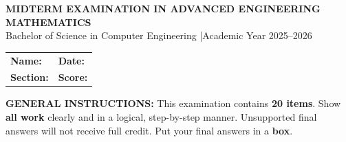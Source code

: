\documentclass[a4paper,10pt]{article}
\begin{document}

\begin{center}
    {\Large\bfseries\color{darkblue} MIDTERM EXAMINATION IN ADVANCED ENGINEERING MATHEMATICS}\\[4pt]
    {\small\color{black} Bachelor of Science in Computer Engineering \quad|\quad Academic Year 2025--2026}\\[6pt]
    \begin{tabular}{@{}p{} p{}@{}}
        \textbf{Name:}\enspace\underline{\hfill\hspace{6cm}}    &
        \textbf{Date:}\enspace\underline{\hfill\hspace{6cm}}      \\[6pt]
        \textbf{Section:}\enspace\underline{\hfill\hspace{6cm}} &
        \textbf{Score:}\enspace\underline{\hfill\hspace{6cm}}     \\
    \end{tabular}
\end{center}

\vspace{5pt}

\textbf{GENERAL INSTRUCTIONS:} This examination contains \textbf{20 items}. Show \textbf{all work} clearly and in a logical, step-by-step manner. Unsupported final answers will not receive full credit. Put your final answers in a \textbf{box}.
\end{document}
